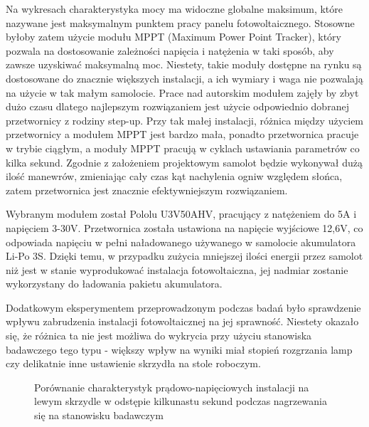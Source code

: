 \documentclass[12pt, a4paper]{article}
\begin{document}
Na wykresach charakterystyka mocy ma widoczne globalne maksimum, które nazywane jest maksymalnym punktem pracy panelu fotowoltaicznego. Stosowne byłoby zatem użycie modułu MPPT (Maximum Power Point Tracker), który pozwala na dostosowanie zależności napięcia i natężenia w taki sposób, aby zawsze uzyskiwać maksymalną moc. Niestety, takie moduły dostępne na rynku są dostosowane do znacznie większych instalacji, a ich wymiary i waga nie pozwalają na użycie w tak małym samolocie. Prace nad autorskim modułem zajęły by zbyt dużo czasu dlatego najlepszym rozwiązaniem jest użycie odpowiednio dobranej przetwornicy z rodziny step-up. Przy tak małej instalacji, różnica między użyciem przetwornicy a modułem MPPT jest bardzo mała, ponadto przetwornica pracuje w trybie ciągłym, a moduły MPPT pracują w cyklach ustawiania parametrów co kilka sekund. Zgodnie z założeniem projektowym samolot będzie wykonywał dużą ilość manewrów, zmieniając cały czas kąt nachylenia ogniw względem słońca, zatem przetwornica jest znacznie efektywniejszym rozwiązaniem.

Wybranym modułem został Pololu U3V50AHV, pracujący z natężeniem do 5A i napięciem 3-30V. Przetwornica została ustawiona na napięcie wyjściowe 12,6V, co odpowiada napięciu w pełni naładowanego używanego w samolocie akumulatora Li-Po 3S. Dzięki temu, w przypadku zużycia mniejszej ilości energii przez samolot niż jest w stanie wyprodukować instalacja fotowoltaiczna, jej nadmiar zostanie wykorzystany do ładowania pakietu akumulatora.

Dodatkowym eksperymentem przeprowadzonym podczas badań było sprawdzenie wpływu zabrudzenia instalacji fotowoltaicznej na jej sprawność. Niestety okazało się, że różnica ta nie jest możliwa do wykrycia przy użyciu stanowiska badawczego tego typu - większy wpływ na wyniki miał stopień rozgrzania lamp czy delikatnie inne ustawienie skrzydła na stole roboczym.

\begin{figure}[ht]
    \centering
    \qquad
    \caption{Porównanie charakterystyk prądowo-napięciowych instalacji na lewym skrzydle w odstępie kilkunastu sekund podczas nagrzewania się na stanowisku badawczym}
    \label{fig:cieple}
\end{figure}
\end{document}
